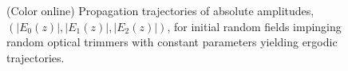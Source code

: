 \documentclass[9pt,twocolumn,twoside]{osajnl}
\begin{document}
\begin{figure}[htbp]
	\centering
	\caption{(Color online) Propagation trajectories of absolute amplitudes, $(\vert E_{0}(z) \vert, \vert E_{1}(z) \vert, \vert E_{2}(z) \vert )$, for initial random fields impinging random optical trimmers with constant parameters yielding ergodic trajectories.}
	\label{fig:Fig5}
\end{figure}
\end{document}
